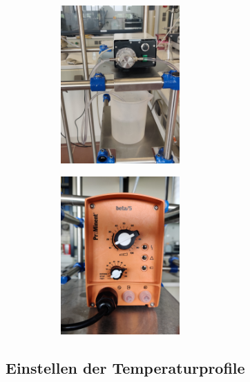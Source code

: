 \documentclass[a4paper, 11pt, draft=false]{scrartcl}
\begin{document}
		\begin{figure}[h!]
		\begin{subfigure}[c]{0.5\textwidth}
			\centering
			\includegraphics[width=0.5\textwidth,angle=-90]{img/Zahnradpumpe}
			\captionsetup{labelformat=empty}
		\end{subfigure}
		\begin{subfigure}[c]{0.5\textwidth}
			\centering
			\includegraphics[width=0.5\textwidth, angle=-90]{img/Prominent}
			\captionsetup{labelformat=empty}
		\end{subfigure}
	\end{figure}
	\FloatBarrier
	
	\subsection{Einstellen der Temperaturprofile}
\end{document}
